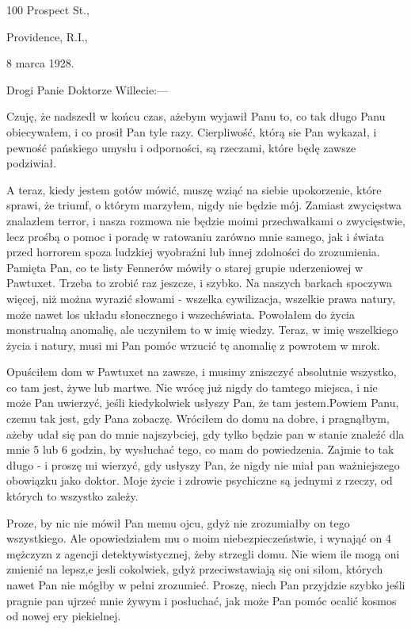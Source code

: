 \begin{displayquote}

\begin{flushright}
100 Prospect St.,

Providence, R.I.,

8 marca 1928.
\end{flushright}

Drogi Panie Doktorze Willecie:—

Czuję, że nadszedł w końcu czas, ażebym wyjawił Panu to, co tak długo Panu obiecywałem, i co prosił Pan tyle razy. Cierpliwość, którą sie Pan wykazał, i pewność pańskiego umysłu i odporności, są rzeczami, które będę zawsze podziwiał. 

A teraz, kiedy jestem gotów mówić, muszę wziąć na siebie upokorzenie, które sprawi, że triumf, o którym marzyłem, nigdy nie będzie mój. Zamiast zwycięstwa znalazłem terror, i nasza rozmowa nie będzie moimi przechwałkami o zwycięstwie, lecz prośbą o pomoc i poradę w ratowaniu zarówno mnie samego, jak i świata przed horrorem spoza ludzkiej wyobraźni lub innej zdolności do zrozumienia. Pamięta Pan, co te listy Fennerów mówiły o starej grupie uderzeniowej w Pawtuxet. Trzeba to zrobić raz jeszcze, i szybko. Na naszych barkach spoczywa więcej, niż można wyrazić słowami - wszelka cywilizacja, wszelkie prawa natury, może nawet los układu słonecznego i wszechświata. Powołałem do życia monstrualną anomalię, ale uczyniłem to w imię wiedzy. Teraz, w imię wszelkiego życia i natury, musi mi Pan pomóc wrzucić tę anomalię z powrotem w mrok. 

Opuściłem dom w Pawtuxet na zawsze, i musimy zniszczyć absolutnie wszystko, co tam jest, żywe lub martwe. Nie wrócę już nigdy do tamtego miejsca, i nie może Pan uwierzyć, jeśli kiedykolwiek usłyszy Pan, że tam jestem.Powiem Panu, czemu tak jest, gdy Pana zobaczę. Wróciłem do domu na dobre, i pragnąłbym, ażeby udał się pan do mnie najszybciej, gdy tylko będzie pan w stanie znaleźć dla mnie 5 lub 6 godzin, by wysłuchać tego, co mam do powiedzenia. Zajmie to tak długo - i proszę mi wierzyć, gdy usłyszy Pan, że nigdy nie miał pan ważniejszego obowiązku jako doktor. Moje życie i zdrowie psychiczne są jednymi z rzeczy, od których to wszystko zależy.

Proze, by nic nie mówił Pan memu ojcu, gdyż nie zrozumiałby on tego wszystkiego. Ale opowiedziałem mu o moim niebezpieczeństwie, i wynająć on 4 mężczyzn z agencji detektywistycznej, żeby strzegli domu. Nie wiem ile mogą oni zmienić na lepsz,e jesli cokolwiek, gdyż przeciwstawiają się oni siłom, których nawet Pan nie mógłby w pełni zrozumieć. Proszę, niech Pan przyjdzie szybko jeśli pragnie pan ujrzeć mnie żywym i posłuchać, jak może Pan pomóc ocalić kosmos od nowej ery piekielnej.


\end{displayquote}
